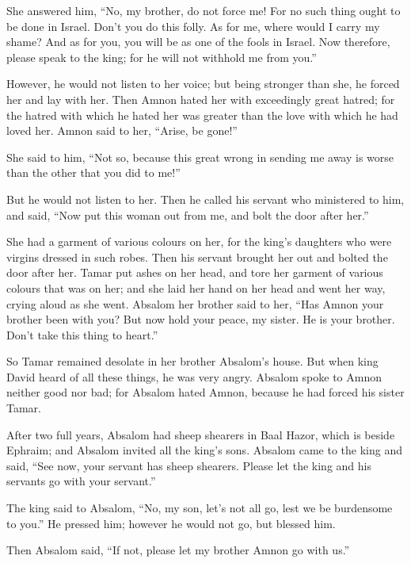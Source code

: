  She answered him, ``No, my brother, do not force me! For
no such thing ought to be done in Israel. Don't you do this folly.
 As for me, where would I carry my shame? And as for you,
you will be as one of the fools in Israel. Now therefore, please speak
to the king; for he will not withhold me from you.''

 However, he would not listen to her voice; but being
stronger than she, he forced her and lay with her.  Then
Amnon hated her with exceedingly great hatred; for the hatred with which
he hated her was greater than the love with which he had loved her.
Amnon said to her, ``Arise, be gone!''

 She said to him, ``Not so, because this great wrong in
sending me away is worse than the other that you did to me!''

But he would not listen to her.  Then he called his servant
who ministered to him, and said, ``Now put this woman out from me, and
bolt the door after her.''

 She had a garment of various colours on her, for the
king's daughters who were virgins dressed in such robes. Then his
servant brought her out and bolted the door after her. 
Tamar put ashes on her head, and tore her garment of various colours
that was on her; and she laid her hand on her head and went her way,
crying aloud as she went.  Absalom her brother said to her,
``Has Amnon your brother been with you? But now hold your peace, my
sister. He is your brother. Don't take this thing to heart.''

So Tamar remained desolate in her brother Absalom's house. 
But when king David heard of all these things, he was very angry.
 Absalom spoke to Amnon neither good nor bad; for Absalom
hated Amnon, because he had forced his sister Tamar.

 After two full years, Absalom had sheep shearers in Baal
Hazor, which is beside Ephraim; and Absalom invited all the king's sons.
 Absalom came to the king and said, ``See now, your servant
has sheep shearers. Please let the king and his servants go with your
servant.''

 The king said to Absalom, ``No, my son, let's not all go,
lest we be burdensome to you.'' He pressed him; however he would not go,
but blessed him.

 Then Absalom said, ``If not, please let my brother Amnon
go with us.''

